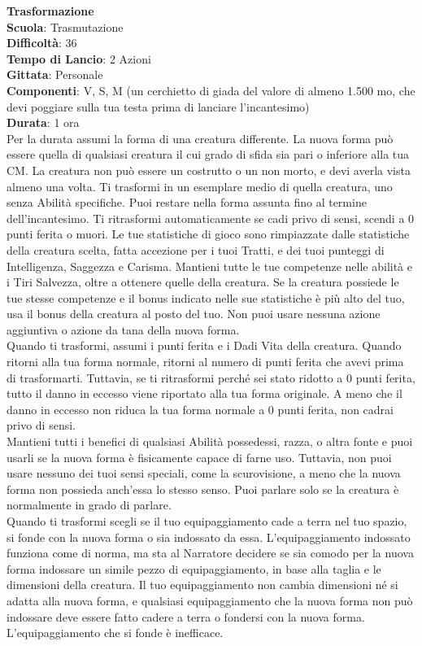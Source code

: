 \begin{multicols}{2}
\medskip\textbf{Trasformazione}\\
\textbf{Scuola}: Trasmutazione\\
\textbf{Difficoltà}: 36\\
\textbf{Tempo di Lancio}: 2 Azioni\\
\textbf{Gittata}: Personale\\
\textbf{Componenti}: V, S, M (un cerchietto di giada del valore di almeno 1.500 mo, che devi poggiare sulla tua testa prima di lanciare l'incantesimo)\\
\textbf{Durata}: 1 ora\\
Per la durata assumi la forma di una creatura differente. La nuova forma può essere quella di qualsiasi creatura il cui grado di sfida sia pari o inferiore alla tua CM. La creatura non può essere un costrutto o un non morto, e devi averla vista almeno una volta. Ti trasformi in un esemplare medio di quella creatura, uno senza Abilità specifiche. Puoi restare nella forma assunta fino al termine dell'incantesimo. Ti ritrasformi automaticamente se cadi privo di sensi, scendi a 0 punti ferita o muori. Le tue statistiche di gioco sono rimpiazzate dalle statistiche della creatura scelta, fatta accezione per i tuoi Tratti, e dei tuoi punteggi di Intelligenza, Saggezza e Carisma. Mantieni tutte le tue competenze nelle abilità e i Tiri Salvezza, oltre a ottenere quelle della creatura. Se la creatura possiede le tue stesse competenze e il bonus indicato nelle sue statistiche è più alto del tuo, usa il bonus della creatura al posto del tuo. Non puoi usare nessuna azione aggiuntiva o azione da tana della nuova forma.\\
Quando ti trasformi, assumi i punti ferita e i Dadi Vita della creatura. Quando ritorni alla tua forma normale, ritorni al numero di punti ferita che avevi prima di trasformarti. Tuttavia, se ti ritrasformi perché sei stato ridotto a 0 punti ferita, tutto il danno in eccesso viene riportato alla tua forma originale. A meno che il danno in eccesso non riduca la tua forma normale a 0 punti ferita, non cadrai privo di sensi. \\
Mantieni tutti i benefici di qualsiasi Abilità possedessi, razza, o altra fonte e puoi usarli se la nuova forma è fisicamente capace di farne uso. Tuttavia, non puoi usare nessuno dei tuoi sensi speciali, come la scurovisione, a meno che la nuova forma non possieda anch'essa lo stesso senso. Puoi parlare solo se la creatura è normalmente in grado di parlare.\\
Quando ti trasformi scegli se il tuo equipaggiamento cade a terra nel tuo spazio, si fonde con la nuova forma o sia indossato da essa. L'equipaggiamento indossato funziona come di norma, ma sta al Narratore decidere se sia comodo per la nuova forma indossare un simile pezzo di equipaggiamento, in base alla taglia e le dimensioni della creatura. Il tuo equipaggiamento non cambia dimensioni né si adatta alla nuova forma, e qualsiasi equipaggiamento che la nuova forma non può indossare deve essere fatto cadere a terra o fondersi con la nuova forma. L'equipaggiamento che si fonde è inefficace.\\

\end{multicols}
